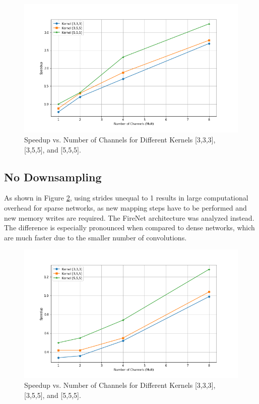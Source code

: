 \documentclass{article}
\begin{document}
\begin{figure}[h!]
    \centering
    \includegraphics[width=\linewidth]{figures/Plots/speedup_var_kernel_122+step1.png}
    \caption{Speedup vs. Number of Channels for Different Kernels [3,3,3], [3,5,5], and [5,5,5].}
    \label{fig:speedup_var_kernel}
\end{figure}

\subsection{No Downsampling}
\label{no_downsampling}
As shown in Figure \ref{fig:kernel_size}, using strides unequal to 1 results in large computational overhead for sparse networks, as new mapping steps have to be performed and new memory writes are required. The FireNet architecture was analyzed instead. The difference is especially pronounced when compared to dense networks, which are much faster due to the smaller number of convolutions.

\begin{figure}[h!]
    \centering
    \includegraphics[width=\linewidth]{figures/Plots/kernel_size(1,1,1).png}
    \caption{Speedup vs. Number of Channels for Different Kernels [3,3,3], [3,5,5], and [5,5,5].}
    \label{fig:kernel_size}
\end{figure}
\end{document}
